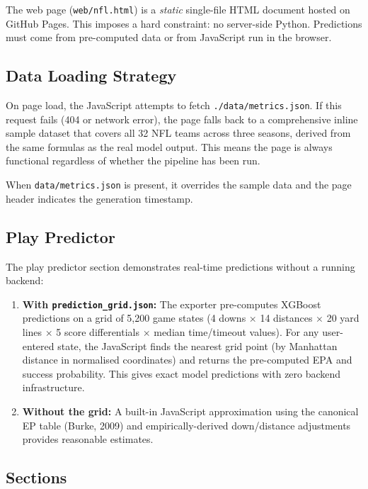 \documentclass[11pt]{article}
\begin{document}
The web page (\texttt{web/nfl.html}) is a \emph{static} single-file HTML
document hosted on GitHub Pages. This imposes a hard constraint: no
server-side Python. Predictions must come from pre-computed data or from
JavaScript run in the browser.

\subsection{Data Loading Strategy}

On page load, the JavaScript attempts to fetch \texttt{./data/metrics.json}.
If this request fails (404 or network error), the page falls back to a
comprehensive inline sample dataset that covers all 32 NFL teams across
three seasons, derived from the same formulas as the real model output.
This means the page is always functional regardless of whether the pipeline
has been run.

When \texttt{data/metrics.json} is present, it overrides the sample data
and the page header indicates the generation timestamp.

\subsection{Play Predictor}

The play predictor section demonstrates real-time predictions without a
running backend:
\begin{enumerate}
  \item \textbf{With \texttt{prediction\_grid.json}:} The exporter pre-computes
    XGBoost predictions on a grid of 5,200 game states
    (4 downs $\times$ 14 distances $\times$ 20 yard lines $\times$ 5 score
    differentials $\times$ median time/timeout values). For any user-entered
    state, the JavaScript finds the nearest grid point (by Manhattan distance
    in normalised coordinates) and returns the pre-computed EPA and success
    probability. This gives exact model predictions with zero backend infrastructure.
  \item \textbf{Without the grid:} A built-in JavaScript approximation using
    the canonical EP table (Burke, 2009) and empirically-derived down/distance
    adjustments provides reasonable estimates.
\end{enumerate}

\subsection{Sections}
\end{document}
